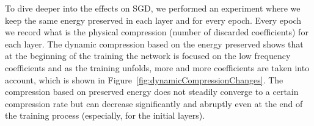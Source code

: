 To dive deeper into the effects on SGD, we performed an experiment where we keep the same energy preserved in each layer and for every epoch. Every epoch we record what is the physical compression (number of discarded coefficients) for each layer. The dynamic compression based on the energy preserved shows that at the beginning of the training the network is focused on the low frequency coefficients and as the training unfolds, more and more coefficients are taken into account, which is shown in Figure~\ref{fig:dynamicCompressionChanges}. The compression based on preserved energy does not steadily converge to a certain compression rate but can decrease significantly and abruptly even at the end of the training process (especially, for the initial layers).

 


